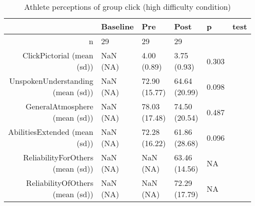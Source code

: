 \begin{table}[ht]
\centering
\begin{tabular}{rlllll}
  \hline
 & Baseline & Pre & Post & p & test \\ 
  \hline
n &  29 &    29 &    29 &  &  \\ 
  ClickPictorial (mean (sd)) & NaN (NA) &  4.00 (0.89) &  3.75 (0.93) &  0.303 &  \\ 
  UnspokenUnderstanding (mean (sd)) & NaN (NA) & 72.90 (15.77) & 64.64 (20.99) &  0.098 &  \\ 
  GeneralAtmosphere (mean (sd)) & NaN (NA) & 78.03 (17.48) & 74.50 (20.54) &  0.487 &  \\ 
  AbilitiesExtended (mean (sd)) & NaN (NA) & 72.28 (16.22) & 61.86 (28.68) &  0.096 &  \\ 
  ReliabilityForOthers (mean (sd)) & NaN (NA) &   NaN (NA) & 63.46 (14.56) &  NA &  \\ 
  ReliabilityOfOthers (mean (sd)) & NaN (NA) &   NaN (NA) & 72.29 (17.79) &  NA &  \\ 
   \hline
\end{tabular}
\caption{Athlete perceptions of 
 group click (high difficulty condition)} 
\end{table}
